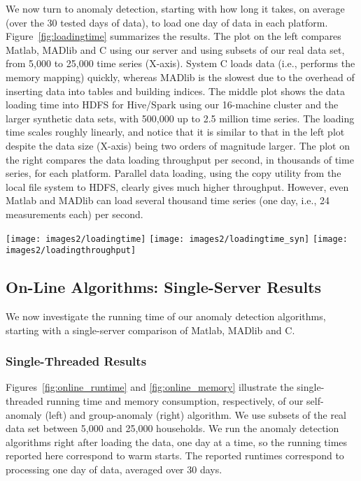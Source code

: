 \documentclass[prodmode,acmtods]{acmsmall}
\begin{document}
We now turn to anomaly detection, starting with how long it takes, on average (over the 30 tested days of data), to load one day of data in each platform.  Figure~\ref{fig:loadingtime} summarizes the results.  The plot on the left compares Matlab, MADlib and C using our server and using subsets of our real data set, from 5,000 to 25,000 time series (X-axis).  System C loads data (i.e., performs the memory mapping) quickly, whereas MADlib is the slowest due to the overhead of inserting data into tables and building indices.  The middle plot shows the data loading time into HDFS for Hive/Spark using our 16-machine cluster and the larger synthetic data sets, with 500,000 up to 2.5 million time series.  The loading time scales roughly linearly, and notice that it is similar to that in the left plot despite the data size (X-axis) being two orders of magnitude larger.  The plot on the right compares the data loading throughput per second, in thousands of time series, for each platform.  Parallel data loading, using the copy utility from the local file system to HDFS, clearly gives much higher throughput.  However, even Matlab and MADlib can load several thousand time series (one day, i.e., 24 measurements each) per second. 

\begin{figure*}[t]
\centering
\texttt{[image: images2/loadingtime]}
\texttt{[image: images2/loadingtime\_syn]}
\texttt{[image: images2/loadingthroughput]}
   \caption{Average data loading time per day for single server (left) and cluster (middle), and loading throughput comparison (right).}
  \label{fig:loadingtime} 
\end{figure*}


\subsection{On-Line Algorithms: Single-Server Results} \label{sec:online_server}

We now investigate the running time of our anomaly detection algorithms, starting with a single-server comparison of Matlab, MADlib and C. 

\subsubsection{Single-Threaded Results}

Figures~\ref{fig:online_runtime} and \ref{fig:online_memory} illustrate the single-threaded running time and memory consumption, respectively, of our self-anomaly (left) and group-anomaly (right) algorithm.  We use subsets of the real data set between 5,000 and 25,000 households.  We run the anomaly detection algorithms right after loading the data, one day at a time, so the running times reported here correspond to warm starts.  The reported runtimes correspond to processing one day of data, averaged over 30 days.
\end{document}
